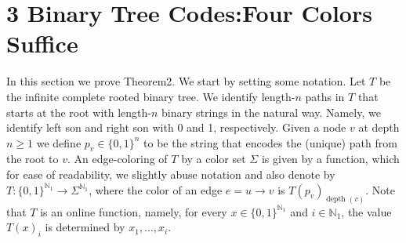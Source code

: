 \section*{3 Binary Tree Codes:Four Colors Suffice}
In this section we prove Theorem2. We start by setting some notation. Let $T$ be the infinite complete rooted binary tree. We identify length-$n$ paths in $T$ that starts at the root with length-$n$ binary strings in the natural way. Namely, we identify left son and right son with 0 and 1, respectively. Given a node $v$ at depth $n\ge1$ we define $p_v\in\{0,1\}^n$ to be the string that encodes the (unique) path from the root to $v$.
An edge-coloring of $T$ by a color set $\Sigma$ is given by a function, which for ease of readability, we slightly abuse notation and also denote by $T:\{0,1\}^{\mathbb N_1}\to\Sigma^{\mathbb N_1}$, where the color of an edge $e=u\to v$ is $T(p_v)_{\operatorname{depth}(v)}$. Note that $T$ is an online function, namely, for every $x\in\{0,1\}^{\mathbb N_1}$ and $i\in\mathbb N_1$, the value $T(x)_i$ is determined by $x_1,\ldots,x_i$.
